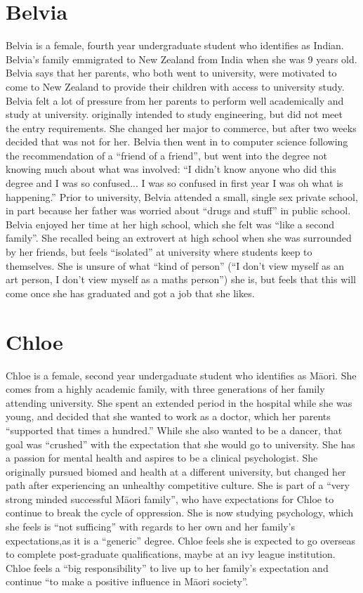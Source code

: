 \section*{Belvia}
Belvia is a female, fourth year undergraduate student who identifies as Indian. Belvia's family emmigrated to New Zealand from India when she was 9 years old. Belvia says that her parents, who both went to university, were motivated to come to New Zealand to provide their children with access to university study. Belvia felt a lot of pressure from her parents to perform well academically and study at university. originally intended to study engineering, but did not meet the entry requirements. She changed her major to commerce, but after two weeks decided that was not for her. Belvia then went in to computer science following the recommendation of a ``friend of a friend'', but went into the degree not knowing much about what was involved: ``I didn’t know anyone who did this degree and I was so confused... I was so confused in first year I was oh what is happening.'' Prior to university, Belvia attended a small, single sex private school, in part because her father was worried about ``drugs and stuff'' in public school. Belvia enjoyed her time at her high school, which she felt was ``like a second family''. She recalled being an extrovert at high school when she was surrounded by her friends, but feels ``isolated'' at university where students keep to themselves. She is unsure of what ``kind of person'' (``I don’t view myself as an art person, I don't view myself as a maths person'') she is, but feels that this will come once she has graduated and got a job that she likes.


\section*{Chloe}
Chloe is a female, second year undergaduate student who identifies as M\={a}ori. She comes from a highly academic family, with three generations of her family attending university. She spent an extended period in the hospital while she was young, and decided that she wanted to work as a doctor, which her parents ``supported that times a hundred.'' While she also wanted to be a dancer, that goal was ``crushed'' with the expectation that she would go to university. She has a passion for mental health and aspires to be a clinical psychologist. She originally pursued biomed and health at a different university, but changed her path after experiencing an unhealthy competitive culture. She is part of a ``very strong minded successful M\={a}ori family'', who have expectations for Chloe to continue to break the cycle of oppression. She is now studying psychology, which she feels is ``not sufficing'' with regards to her own and her family's expectations,as it is a ``generic'' degree. Chloe feels she is expected to go overseas to complete post-graduate qualifications, maybe at an ivy league institution. Chloe feels a ``big responsibility'' to live up to her family's expectation and continue ``to make a positive influence in M\={a}ori society''.


